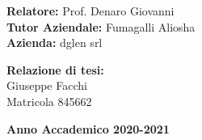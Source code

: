 \begin{titlepage}
	\vspace{40mm}
	
	\noindent
	{\large \textbf{Relatore:} Prof. Denaro Giovanni } \\
	
	\noindent
	{\large \textbf{Tutor Aziendale:} Fumagalli Aliosha} \\

    \noindent
	{\large \textbf{Azienda:} dglen srl}
	
    
	\vspace{15mm}
	
	\begin{flushright}
		{\large \textbf{Relazione di tesi:}} \\
		\large{Giuseppe Facchi} \\
		\large{Matricola 845662} 
	\end{flushright}
	
	\vspace{20mm}
	\begin{center}
		{\large{\bf Anno Accademico 2020-2021}}
	\end{center}
	
	\restoregeometry
	
\end{titlepage}